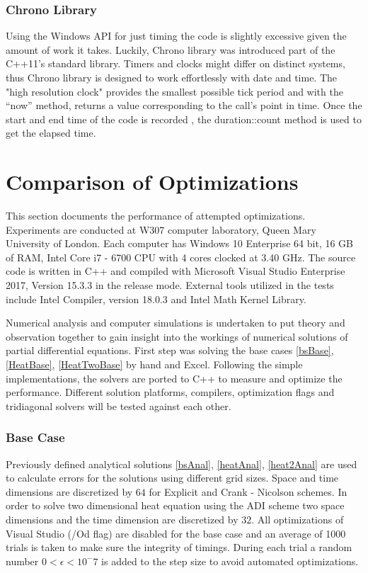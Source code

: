 \documentclass[12pt, oneside]{book}
\theoremstyle{plain}
\theoremstyle{definition}
\begin{document}
\subsection{Chrono Library}
Using the Windows API for just timing the code is slightly excessive given the amount of work it takes. Luckily, Chrono library was introduced part of the C++11’s standard library.  Timers and clocks might differ on distinct systems, thus Chrono library is designed to work effortlessly with date and time. The "high resolution clock" provides the smallest possible tick period and with the “now” method, returns a value corresponding to the call’s point in time.  Once the start and end time of the code is recorded ,  the duration::count method is used to get the elapsed time.


\chapter{Comparison of Optimizations}
This section documents the performance of attempted optimizations. Experiments are  conducted at W307 computer laboratory, Queen Mary University of London. Each computer has Windows 10 Enterprise 64 bit, 16 GB of RAM, Intel Core i7 - 6700 CPU with 4 cores clocked at 3.40 GHz. The source code is written in C++ and compiled with Microsoft Visual Studio Enterprise 2017, Version 15.3.3 in the release mode. External tools  utilized in the tests include Intel Compiler, version 18.0.3 and Intel Math Kernel Library. 

Numerical analysis and computer simulations is undertaken to put theory and observation together to gain insight into the workings of numerical solutions of partial differential equations. First step was solving the base cases \ref{bsBase}, \ref{HeatBase}, \ref{HeatTwoBase} by hand and Excel. Following the simple implementations, the solvers are ported to C++ to measure and optimize the performance. Different solution platforms, compilers, optimization flags and tridiagonal solvers will be tested against each other.
 
\subsection{Base Case}
Previously defined analytical solutions \ref{bsAnal}, \ref{heatAnal}, \ref{heat2Anal} are used to calculate errors for the solutions using different grid sizes. Space and time dimensions are discretized by $64$ for Explicit and Crank - Nicolson schemes. In order to solve two dimensional heat equation using the ADI scheme two space dimensions and the time dimension are discretized by $32$.  All optimizations of Visual Studio  (/Od flag) are disabled for the base case and an average of 1000 trials is taken to make sure the integrity of timings. During each trial a random number $ 0 < \epsilon < 10^-7 $ is added to the step size to avoid automated optimizations.
\end{document}
